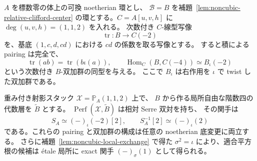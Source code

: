 \begin{proposition}
\label{prop:noncubic-relative-serre-on-perfect}
$A$ を標数零の体上の可換 noetherian 環とし、
$\mathcal B=B$ を補題~\ref{lem:noncubic-relative-clifford-center}
の環とする。$C=A[u,v,h]$ に
$\deg(u,v,h)=(1,1,2)$ を入れる。
次数付き $C$-線型写像
\[
 \operatorname{tr}:B\longrightarrow C(-2)
\]
を、基底 $(1,c,d,cd)$ における $cd$ の係数を取る写像とする。
すると積による pairing は完全で、
\[
 \operatorname{tr}(ab)=\operatorname{tr}(b\iota(a)),
 \qquad
 \operatorname{Hom}_C(B,C(-4))
       \simeq B_{\iota}(-2)
 \tag{NC-Serre}\label{eq:noncubic-relative-serre-bimodule}
\]
という次数付き $B$-双加群の同型を与える。
ここで $B_\iota$ は右作用を $\iota$ で twist した双加群である。

重み付き射影スタック
$\mathcal X=\mathbb P_A(1,1,2)$ 上で、
$B$ から作る局所自由な階数四の代数層を $\widetilde B$ とする。
$\operatorname{Perf}(\mathcal X,\widetilde B)$ は相対 Serre 双対を持ち、
その関手は
\[
 S_A\simeq(-)_\iota(-2)[2],
 \qquad S_A^{-1}[2]\simeq(-)_\iota(2)
 \tag{NC-S}\label{eq:noncubic-relative-serre-functor}
\]
である。これらの pairing と双加群の構成は任意の
noetherian 底変更に両立する。
さらに補題~\ref{lem:noncubic-local-exchange} で得た
$\sigma^2=\iota$ により、適合平方根の候補は
\'etale 局所に exact 関手 $(-)_\sigma(1)$ として得られる。
\end{proposition}
